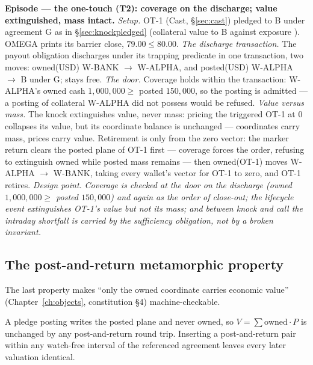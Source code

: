 \medskip\noindent\textbf{Episode --- the one-touch (T2): coverage on the
discharge; value extinguished, mass intact.}
\emph{Setup.} OT-1 (Cast, \S\ref{sec:cast}) pledged to B under agreement G as in
\S\ref{sec:knockpledged} (collateral value to B  against exposure
). OMEGA prints its barrier close, $79.00 \le 80.00$.
\emph{The discharge transaction.} The payout obligation discharges under its
trapping predicate in one transaction, two moves: owned(USD) 
W-BANK $\to$ W-ALPHA, and posted(USD)  W-ALPHA $\to$ B under G;
 stays free.
\emph{The door.} Coverage holds within the transaction: W-ALPHA's owned cash
$1{,}000{,}000 \ge$ posted $150{,}000$, so the posting is admitted --- a posting
of collateral W-ALPHA did not possess would be refused.
\emph{Value versus mass.} The knock extinguishes value, never mass: pricing the
triggered OT-1 at $0$ collapses its value, but its coordinate balance is unchanged
--- coordinates carry mass, prices carry value. Retirement is only from the zero
vector: the marker return clears the posted plane of OT-1 first --- coverage
forces the order, refusing to extinguish owned while posted mass remains --- then
owned(OT-1) moves W-ALPHA $\to$ W-BANK, taking every wallet's vector for OT-1 to
zero, and OT-1 retires.
\emph{Design point.} \emph{Coverage is checked at the door on the discharge
(owned $1{,}000{,}000 \ge$ posted $150{,}000$) and again as the order of close-out;
the lifecycle event extinguishes OT-1's value but not its mass; and between knock
and call the intraday shortfall is carried by the sufficiency obligation, not by a
broken invariant.}

\subsection{The post-and-return metamorphic property}

The last property makes ``only the owned coordinate carries economic value''
(Chapter~\ref{ch:objects}, constitution \S 4) machine-checkable.

\begin{proposition}\label{prop:postreturn}
A pledge posting writes the posted plane and never owned, so $V=\sum
\mathrm{owned}\cdot P$ is unchanged by any post-and-return round trip. Inserting a
post-and-return pair within any watch-free interval of the referenced agreement
leaves every later valuation identical.
\end{proposition}

